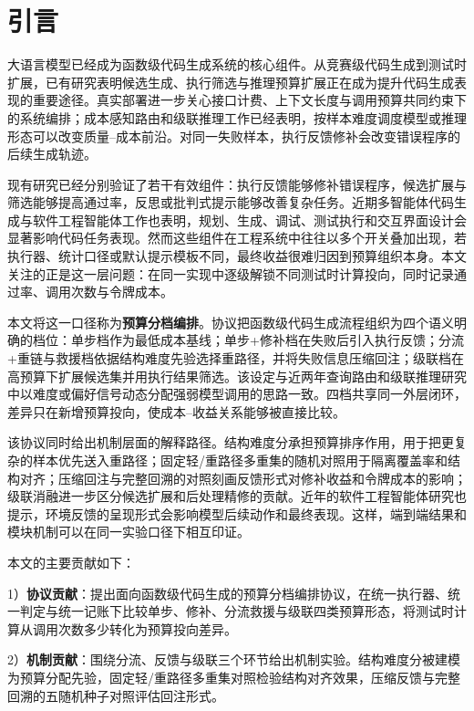 \section{引言}
\label{sec:introduction}

大语言模型已经成为函数级代码生成系统的核心组件。从竞赛级代码生成到测试时扩展，已有研究表明候选生成、执行筛选与推理预算扩展正在成为提升代码生成表现的重要途径\cite{li2022alphacode,li2025sstar}。真实部署进一步关心接口计费、上下文长度与调用预算共同约束下的系统编排；成本感知路由和级联推理工作已经表明，按样本难度调度模型或推理形态可以改变质量--成本前沿\cite{ding2024hybrid,yue2024cascades}。对同一失败样本，执行反馈修补会改变错误程序的后续生成轨迹\cite{chen2024selfdebug,shinn2023reflexion}。

现有研究已经分别验证了若干有效组件：执行反馈能够修补错误程序，候选扩展与筛选能够提高通过率，反思或批判式提示能够改善复杂任务。近期多智能体代码生成与软件工程智能体工作也表明，规划、生成、调试、测试执行和交互界面设计会显著影响代码任务表现\cite{islam2024mapcoder,yang2024sweagent}。然而这些组件在工程系统中往往以多个开关叠加出现，若执行器、统计口径或默认提示模板不同，最终收益很难归因到预算组织本身。本文关注的正是这一层问题：在同一实现中逐级解锁不同测试时计算投向，同时记录通过率、调用次数与令牌成本。

本文将这一口径称为\textbf{预算分档编排}。协议把函数级代码生成流程组织为四个语义明确的档位：单步档作为最低成本基线；单步+修补档在失败后引入执行反馈；分流+重链与救援档依据结构难度先验选择重路径，并将失败信息压缩回注；级联档在高预算下扩展候选集并用执行结果筛选。该设定与近两年查询路由和级联推理研究中以难度或偏好信号动态分配强弱模型调用的思路一致\cite{yue2024cascades,ong2025routellm}。四档共享同一外层闭环，差异只在新增预算投向，使成本--收益关系能够被直接比较。

该协议同时给出机制层面的解释路径。结构难度分承担预算排序作用，用于把更复杂的样本优先送入重路径；固定轻/重路径多重集的随机对照用于隔离覆盖率和结构对齐；压缩回注与完整回溯的对照刻画反馈形式对修补收益和令牌成本的影响；级联消融进一步区分候选扩展和后处理精修的贡献。近年的软件工程智能体研究也提示，环境反馈的呈现形式会影响模型后续动作和最终表现\cite{yang2024sweagent}。这样，端到端结果和模块机制可以在同一实验口径下相互印证。

本文的主要贡献如下：

1）\textbf{协议贡献}：提出面向函数级代码生成的预算分档编排协议，在统一执行器、统一判定与统一记账下比较单步、修补、分流救援与级联四类预算形态，将测试时计算从调用次数多少转化为预算投向差异。

2）\textbf{机制贡献}：围绕分流、反馈与级联三个环节给出机制实验。结构难度分被建模为预算分配先验，固定轻/重路径多重集对照检验结构对齐效果，压缩反馈与完整回溯的五随机种子对照评估回注形式。

